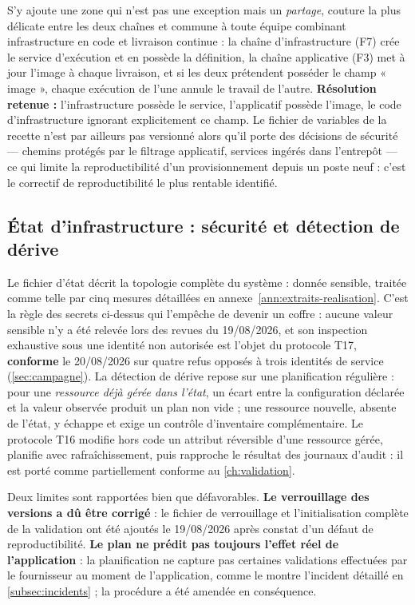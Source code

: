 S'y ajoute une zone qui n'est pas une exception mais un \emph{partage}, couture la plus délicate
entre les deux chaînes et commune à toute équipe combinant infrastructure en code
\cite{iac_morris2020} et livraison continue : la chaîne d'infrastructure (F7) crée le service
d'exécution et en possède la définition, la chaîne applicative (F3) met à jour l'image à chaque
livraison, et si les deux prétendent posséder le champ « image », chaque exécution de l'une annule
le travail de l'autre. \textbf{Résolution retenue :} l'infrastructure possède le service,
l'applicatif possède l'image, le code d'infrastructure ignorant explicitement ce champ. Le fichier
de variables de la recette n'est par ailleurs pas versionné alors qu'il porte des décisions de
sécurité --- chemins protégés par le filtrage applicatif, services ingérés dans l'entrepôt --- ce
qui limite la reproductibilité d'un provisionnement depuis un poste neuf : c'est le correctif de
reproductibilité le plus rentable identifié.

\subsection{État d'infrastructure : sécurité et détection de dérive}
\label{subsec:derive}

Le fichier d'état décrit la topologie complète du système : donnée sensible, traitée comme telle par
cinq mesures détaillées en annexe~\ref{ann:extraits-realisation}. C'est la règle des secrets
ci-dessus qui l'empêche de devenir un coffre : aucune valeur sensible n'y a été relevée lors des
revues du 19/08/2026, et son inspection exhaustive sous une identité non autorisée est l'objet du
protocole T17, \textbf{conforme} le 20/08/2026 sur quatre refus opposés à trois identités de service
(\cref{sec:campagne}). La détection de dérive \cite{hashicorp_drift} repose sur une planification
régulière : pour une \emph{ressource déjà gérée dans l'état}, un écart entre la configuration
déclarée et la valeur observée produit un plan non vide ; une ressource nouvelle, absente de l'état,
y échappe et exige un contrôle d'inventaire complémentaire. Le protocole T16 modifie hors code un
attribut réversible d'une ressource gérée, planifie avec rafraîchissement, puis rapproche le
résultat des journaux d'audit : il est porté comme partiellement conforme au \cref{ch:validation}.

\begin{alertbox}[boxsep=1pt, left=4pt, right=4pt, top=3pt, bottom=3pt]
Deux limites sont rapportées bien que défavorables. \textbf{Le verrouillage des versions a dû être
corrigé} : le fichier de verrouillage et l'initialisation complète de la validation ont été ajoutés
le 19/08/2026 après constat d'un défaut de reproductibilité. \textbf{Le plan ne prédit pas toujours
l'effet réel de l'application} : la planification ne capture pas certaines validations effectuées
par le fournisseur au moment de l'application, comme le montre l'incident détaillé en
\cref{subsec:incidents} ; la procédure a été amendée en conséquence.
\end{alertbox}

